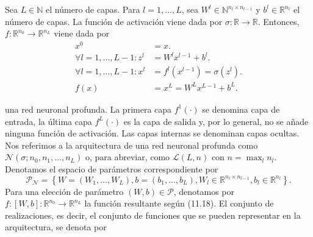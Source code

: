 \begin{frame}
    \begin{definition}
        Sea $L\in\mathbb{N}$ el número de capas.
        Para $l=1,\dotsc,L$, sea
        $W^{l}\in\mathbb{N}^{n_{l}\times n_{l-1}}$ y
        $b^{l}\in\mathbb{R}^{n_{l}}$ el número de capas.
        La función de activación viene dada por $\sigma\colon\mathbb{R}\to\mathbb{R}$.
        Entonces, $f\colon\mathbb{R}^{n_{0}}\to\mathbb{R}^{n_{L}}$ viene dada por
        \vspace*{-.5\baselineskip}\setlength\belowdisplayshortskip{0pt}
        \begin{align*}
            x^{0}           & =x.                                                  \\
            \forall l=1,\dotsc,L-1:
            z^{l}           & =W^{l}x^{l-1}+b^{l}.                                 \\
            \forall l=1,\dotsc,L-1:
            x^{l}           & =f^{l}\left(x^{l-1}\right)=\sigma\left(z^{l}\right). \\
            f\left(x\right) & =x^{L}=W^{L}x^{L-1}+b^{L}.
        \end{align*}
    \end{definition}
    una \alert{red neuronal profunda}.
    La primera capa $f^{1}\left(\cdot\right)$ se denomina capa de
    entrada, la última capa $f^{L}\left(\cdot\right)$ es la capa de
    salida y, por lo general, no se añade ninguna función de activación.
    Las capas internas se denominan capas ocultas.
    Nos referimos a la arquitectura de una red neuronal profunda como
    $\mathcal{N}\left(\sigma;n_{0},n_{1},\dotsc,n_{L}\right)$ o, para
    abreviar, como $\mathcal{L}\left(L,n\right)$ con $n=\max_{l}n_{l}$.
    Denotamos el espacio de parámetros correspondiente por
    \begin{equation*}
        \mathcal{P}_{\mathcal{N}}=
        \left\{
        W=\left(W_{1},\dotsc,W_{L}\right),b=\left(b_{1},\dotsc,b_{L}\right),
        W_{l}\in\mathbb{R}^{n_{l}\times n_{l-1}},b_{l}\in\mathbb{R}^{n_{l}}
        \right\}.
    \end{equation*}
    Para una elección de parámetro $\left(W,b\right)\in\mathcal{P}$,
    denotamos por $f\colon\left[W,b\right]\colon\mathbb{R}^{n_{0}}\to\mathbb{R}^{n_{L}}$
    la función resultante según (11.18).
    El conjunto de realizaciones, es decir, el conjunto de funciones
    que se pueden representar en la arquitectura, se denota por
    \begin{equation*}

\end{equation*}
\end{frame}
